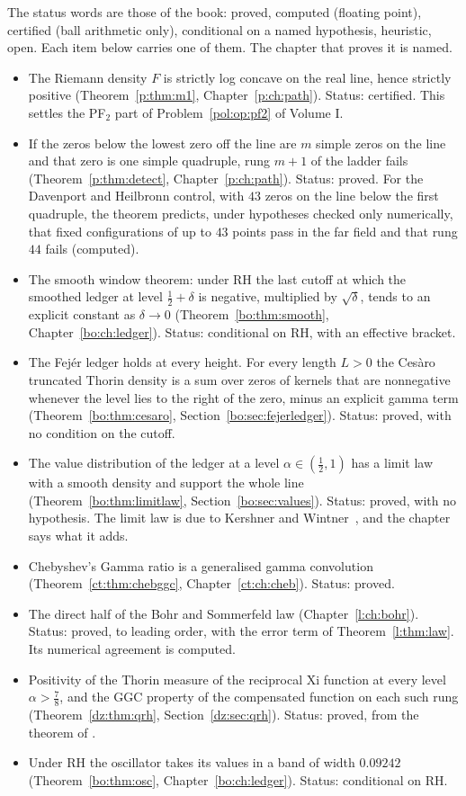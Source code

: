 The status words are those of the book: proved, computed (floating point), certified (ball arithmetic only), conditional on a named hypothesis, heuristic, open. Each item below carries one of them. The chapter that proves it is named.
\begin{itemize}
\item The Riemann density $F$ is strictly log concave on the real line, hence strictly positive (Theorem~\ref{p:thm:m1}, Chapter~\ref{p:ch:path}). Status: certified. This settles the PF$_2$ part of Problem~\ref{pol:op:pf2} of Volume I.
\item If the zeros below the lowest zero off the line are $m$ simple zeros on the line and that zero is one simple quadruple, rung $m+1$ of the ladder fails (Theorem~\ref{p:thm:detect}, Chapter~\ref{p:ch:path}). Status: proved. For the Davenport and Heilbronn control, with $43$ zeros on the line below the first quadruple, the theorem predicts, under hypotheses checked only numerically, that fixed configurations of up to $43$ points pass in the far field and that rung $44$ fails (computed).
\item The smooth window theorem: under RH the last cutoff at which the smoothed ledger at level $\frac12+\delta$ is negative, multiplied by $\sqrt\delta$, tends to an explicit constant as $\delta\to0$ (Theorem~\ref{bo:thm:smooth}, Chapter~\ref{bo:ch:ledger}). Status: conditional on RH, with an effective bracket.
\item The Fej\'er ledger holds at every height. For every length $L>0$ the Ces\`aro truncated Thorin density is a sum over zeros of kernels that are nonnegative whenever the level lies to the right of the zero, minus an explicit gamma term (Theorem~\ref{bo:thm:cesaro}, Section~\ref{bo:sec:fejerledger}). Status: proved, with no condition on the cutoff.
\item The value distribution of the ledger at a level $\alpha\in(\frac12,1)$ has a limit law with a smooth density and support the whole line (Theorem~\ref{bo:thm:limitlaw}, Section~\ref{bo:sec:values}). Status: proved, with no hypothesis. The limit law is due to Kershner and Wintner~\cite{KershnerWintner37}, and the chapter says what it adds.
\item Chebyshev's Gamma ratio is a generalised gamma convolution (Theorem~\ref{ct:thm:chebggc}, Chapter~\ref{ct:ch:cheb}). Status: proved.
\item The direct half of the Bohr and Sommerfeld law (Chapter~\ref{l:ch:bohr}). Status: proved, to leading order, with the error term of Theorem~\ref{l:thm:law}. Its numerical agreement is computed.
\item Positivity of the Thorin measure of the reciprocal Xi function at every level $\alpha>\frac78$, and the GGC property of the compensated function on each such rung (Theorem~\ref{dz:thm:qrh}, Section~\ref{dz:sec:qrh}). Status: proved, from the theorem of \cite{OAI26a}.
\item Under RH the oscillator takes its values in a band of width $0.09242$ (Theorem~\ref{bo:thm:osc}, Chapter~\ref{bo:ch:ledger}). Status: conditional on RH.
\end{itemize}

